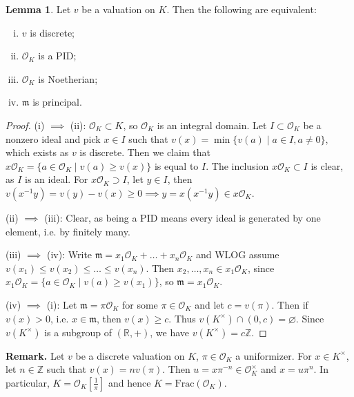 \documentclass{article}
\theoremstyle{definition}
\newtheorem{lemma}[theorem]{Lemma}
\begin{document}
\begin{lemma}
    Let $v$ be a valuation on $K$. Then the following are equivalent:
    \begin{enumerate}[(i)]
        \item $v$ is discrete;
        \item $\mathcal{O}_K$ is a PID;
        \item $\mathcal{O}_K$ is Noetherian;
        \item $\mathfrak{m}$ is principal.
    \end{enumerate}
\end{lemma}
\begin{proof}
    (i) $\implies$ (ii): $\mathcal{O}_K \subset K$, so $\mathcal{O}_K$ is an integral domain. Let $I \subset \mathcal{O}_K$ be a nonzero ideal and pick $x \in I$ such that $v(x) = \min \{v(a) \mid a \in I, a \neq 0\}$, which exists as $v$ is discrete. Then we claim that $x \mathcal{O}_K = \{a \in \mathcal{O}_K \mid v(a)\ge v(x)\}$ is equal to $I$. The inclusion $x\mathcal{O}_K\subset I$ is clear, as $I$ is an ideal. For $x\mathcal{O}_K\supset I$, let $y \in I$, then $v(x^{-1}y) = v(y) - v(x) \ge 0 \implies y = x(x^{-1}y) \in x \mathcal{O}_K$.
    \vspace{1mm}
     
    (ii) $\implies $ (iii): Clear, as being a PID means every ideal is generated by one element, i.e. by finitely many. 
    \vspace{1mm}
     
    (iii) $\implies $ (iv): Write $\mathfrak{m} = x_1 \mathcal{O}_K +\ldots+ x_n \mathcal{O}_K$ and WLOG assume $v(x_1)\le v(x_2)\le \ldots\le v(x_n)$. Then $x_2,\ldots,x_n \in x_1 \mathcal{O}_K$, since $x_1 \mathcal{O}_K = \{a \in \mathcal{O}_K \mid v(a) \ge v(x_1)\}$, so $\mathfrak{m} = x_1 \mathcal{O}_K$.
    \vspace{1mm}
     
    (iv) $\implies $ (i): Let $\mathfrak{m} = \pi \mathcal{O}_K$ for some $\pi \in \mathcal{O}_K$ and let $c = v(\pi)$. Then if $v(x)>0$, i.e. $x \in \mathfrak{m}$, then $v(x) \ge c$. Thus $v(K^\times) \cap (0,c) = \varnothing$. Since $v(K^\times)$ is a subgroup of $(\mathbb{R}, +)$, we have $v(K^{\times}) = c\mathbb{Z}$.
\end{proof}


\textbf{Remark.} Let $v$ be a discrete valuation on $K$, $\pi \in \mathcal{O}_K$ a uniformizer. For $x \in K^{\times}$, let $n \in \mathbb{Z}$ such that $v(x) = n v(\pi)$. Then $u = x \pi^{-n} \in \mathcal{O}_K^{\times}$ and $x = u \pi^n$. In particular, $K = \mathcal{O}_K \left[\frac{1}{\pi}\right]$ and hence $K = \text{Frac}(\mathcal{O}_K)$.
\end{document}

